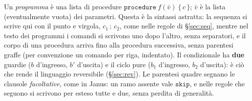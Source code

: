 \noindent
Un \emph{programma} è una lista di procedure
$\mathtt{procedure}\ f(\bar v)\ \{\, c \,\}$; $\bar v$ è la lista (eventualmente
vuota) dei parametri. Questa è la sintassi astratta: la sequenza si scrive qui
con il punto e virgola, $c_1\,;\,c_2$, come nelle regole di \S\ref{sec:seq},
mentre nel testo dei programmi i comandi si scrivono uno dopo l'altro, senza
separatori, e il corpo di una procedura arriva fino alla procedura successiva,
senza parentesi graffe (per convenzione un comando per riga, indentato). Il condizionale ha
\textbf{due} guardie ($b$ d'ingresso, $b'$ d'uscita) e il ciclo pure ($b_1$
d'ingresso, $b_2$ d'uscita): è ciò che rende il linguaggio reversibile
(\S\ref{sec:rev}). Le parentesi quadre segnano le clausole \emph{facoltative},
come in Janus: un ramo assente vale $\mathtt{skip}$, e nelle regole che seguono
si scrivono per esteso tutte e due, senza perdita di generalità.

